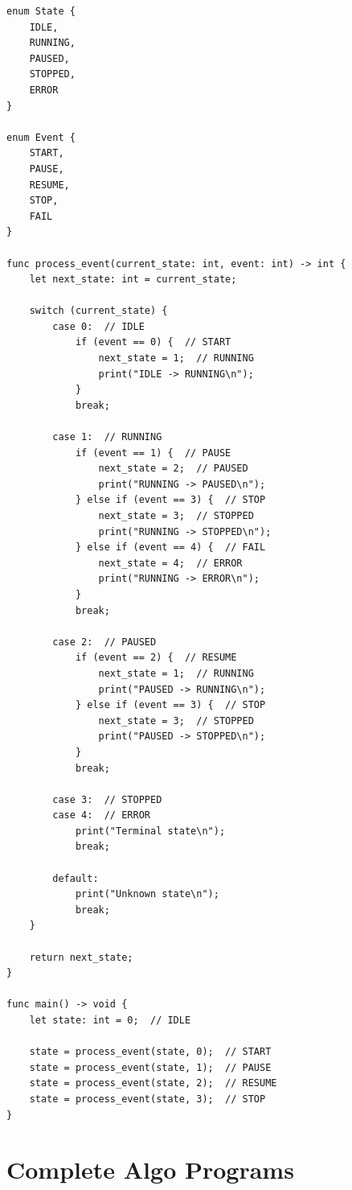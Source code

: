 \documentclass[12pt,a4paper,oneside]{book}
\begin{document}
\begin{lstlisting}[style=algo, caption={State Machine Example}]
enum State {
    IDLE,
    RUNNING,
    PAUSED,
    STOPPED,
    ERROR
}

enum Event {
    START,
    PAUSE,
    RESUME,
    STOP,
    FAIL
}

func process_event(current_state: int, event: int) -> int {
    let next_state: int = current_state;
    
    switch (current_state) {
        case 0:  // IDLE
            if (event == 0) {  // START
                next_state = 1;  // RUNNING
                print("IDLE -> RUNNING\n");
            }
            break;
            
        case 1:  // RUNNING
            if (event == 1) {  // PAUSE
                next_state = 2;  // PAUSED
                print("RUNNING -> PAUSED\n");
            } else if (event == 3) {  // STOP
                next_state = 3;  // STOPPED
                print("RUNNING -> STOPPED\n");
            } else if (event == 4) {  // FAIL
                next_state = 4;  // ERROR
                print("RUNNING -> ERROR\n");
            }
            break;
            
        case 2:  // PAUSED
            if (event == 2) {  // RESUME
                next_state = 1;  // RUNNING
                print("PAUSED -> RUNNING\n");
            } else if (event == 3) {  // STOP
                next_state = 3;  // STOPPED
                print("PAUSED -> STOPPED\n");
            }
            break;
            
        case 3:  // STOPPED
        case 4:  // ERROR
            print("Terminal state\n");
            break;
            
        default:
            print("Unknown state\n");
            break;
    }
    
    return next_state;
}

func main() -> void {
    let state: int = 0;  // IDLE
    
    state = process_event(state, 0);  // START
    state = process_event(state, 1);  // PAUSE
    state = process_event(state, 2);  // RESUME
    state = process_event(state, 3);  // STOP
}
\end{lstlisting}

\chapter{Complete Algo Programs}
\end{document}
